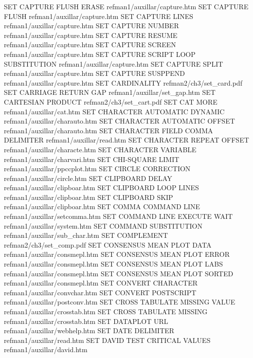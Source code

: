 SET CAPTURE FLUSH ERASE                 refman1/auxillar/capture.htm
SET CAPTURE FLUSH                       refman1/auxillar/capture.htm
SET CAPTURE LINES                       refman1/auxillar/capture.htm
SET CAPTURE NUMBER                      refman1/auxillar/capture.htm
SET CAPTURE RESUME                      refman1/auxillar/capture.htm
SET CAPTURE SCREEN                      refman1/auxillar/capture.htm
SET CAPTURE SCRIPT LOOP SUBSTITUTION    refman1/auxillar/capture.htm
SET CAPTURE SPLIT                       refman1/auxillar/capture.htm
SET CAPTURE SUSPPEND                    refman1/auxillar/capture.htm
SET CARDINALITY                         refman2/ch3/set_card.pdf
SET CARRIAGE RETURN GAP                 refman1/auxillar/set_gap.htm
SET CARTESIAN PRODUCT                   refman2/ch3/set_cart.pdf
SET CAT MORE                            refman1/auxillar/cat.htm
SET CHARACTER AUTOMATIC DYNAMIC         refman1/auxillar/charauto.htm
SET CHARACTER AUTOMATIC OFFSET          refman1/auxillar/charauto.htm
SET CHARACTER FIELD COMMA DELIMITER     refman1/auxillar/read.htm
SET CHARACTER REPEAT OFFSET             refman1/auxillar/characte.htm
SET CHARACTER VARIABLE                  refman1/auxillar/charvari.htm
SET CHI-SQUARE LIMIT                    refman1/auxillar/ppccplot.htm
SET CIRCLE CORRECTION                   refman1/auxillar/circle.htm
SET CLIPBOARD DELAY                     refman1/auxillar/clipboar.htm
SET CLIPBOARD LOOP LINES                refman1/auxillar/clipboar.htm
SET CLIPBOARD SKIP                      refman1/auxillar/clipboar.htm
SET COMMA COMMAND LINE                  refman1/auxillar/setcomma.htm
SET COMMAND LINE EXECUTE WAIT           refman1/auxillar/system.htm
SET COMMAND SUBSTITUTION                refman1/auxillar/sub_char.htm
SET COMPLEMENT                          refman2/ch3/set_comp.pdf
SET CONSENSUS MEAN PLOT DATA            refman1/auxillar/consmepl.htm
SET CONSENSUS MEAN PLOT ERROR           refman1/auxillar/consmepl.htm
SET CONSENSUS MEAN PLOT LABS            refman1/auxillar/consmepl.htm
SET CONSENSUS MEAN PLOT SORTED          refman1/auxillar/consmepl.htm
SET CONVERT CHARACTER                   refman1/auxillar/convchar.htm
SET CONVERT POSTSCRIPT                  refman1/auxillar/postconv.htm
SET CROSS TABULATE MISSING VALUE        refman1/auxillar/crosstab.htm
SET CROSS TABULATE MISSING              refman1/auxillar/crosstab.htm
SET DATAPLOT URL                        refman1/auxillar/webhelp.htm
SET DATE DELIMITER                      refman1/auxillar/read.htm
SET DAVID TEST CRITICAL VALUES          refman1/auxillar/david.htm
